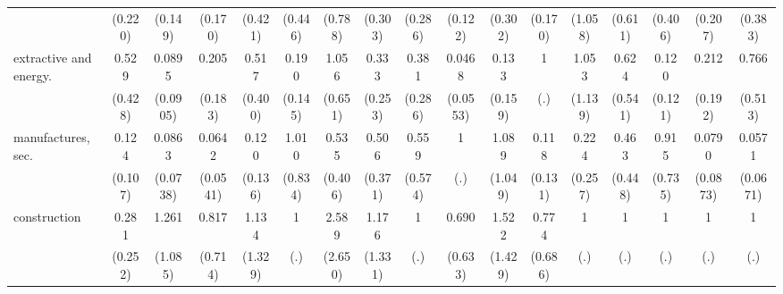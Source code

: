 {\begin{tabular}{l*{16}{c}}
                    &     (0.220)         &     (0.149)         &     (0.170)         &     (0.421)         &     (0.446)         &     (0.788)         &     (0.303)         &     (0.286)         &     (0.122)         &     (0.302)         &     (0.170)         &     (1.058)         &     (0.611)         &     (0.406)         &     (0.207)         &     (0.383)         \\
[1em]
extractive and energy.&       0.529         &      0.0895\sym{*}  &       0.205         &       0.517         &       0.190\sym{*}  &       1.056         &       0.333         &       0.381         &      0.0468\sym{**} &       0.133         &           1         &       1.053         &       0.624         &       0.120\sym{*}  &       0.212         &       0.766         \\
                    &     (0.428)         &    (0.0905)         &     (0.183)         &     (0.400)         &     (0.145)         &     (0.651)         &     (0.253)         &     (0.286)         &    (0.0553)         &     (0.159)         &         (.)         &     (1.139)         &     (0.541)         &     (0.121)         &     (0.192)         &     (0.513)         \\
[1em]
manufactures, sec.  &       0.124\sym{*}  &      0.0863\sym{**} &      0.0642\sym{**} &       0.120         &       1.010         &       0.535         &       0.506         &       0.559         &           1         &       1.089         &       0.118         &       0.224         &       0.463         &       0.915         &      0.0790\sym{*}  &      0.0571\sym{*}  \\
                    &     (0.107)         &    (0.0738)         &    (0.0541)         &     (0.136)         &     (0.834)         &     (0.406)         &     (0.371)         &     (0.574)         &         (.)         &     (1.049)         &     (0.131)         &     (0.257)         &     (0.448)         &     (0.735)         &    (0.0873)         &    (0.0671)         \\
[1em]
construction        &       0.281         &       1.261         &       0.817         &       1.134         &           1         &       2.589         &       1.176         &           1         &       0.690         &       1.522         &       0.774         &           1         &           1         &           1         &           1         &           1         \\
                    &     (0.252)         &     (1.085)         &     (0.714)         &     (1.329)         &         (.)         &     (2.650)         &     (1.331)         &         (.)         &     (0.633)         &     (1.429)         &     (0.686)         &         (.)         &         (.)         &         (.)         &         (.)         &         (.)         \\

\end{tabular}}
